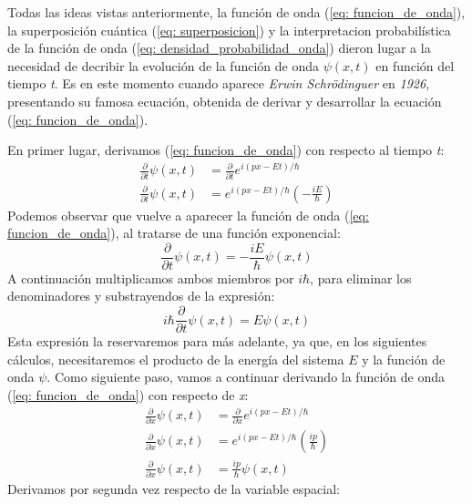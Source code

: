 \documentclass{article}
\numberwithin{equation}{section} %
\begin{document}
    Todas las ideas vistas anteriormente, la función de onda (\ref{eq: funcion_de_onda}), la superposición cuántica (\ref{eq: superposicion}) y la interpretacion probabilística de la función de onda (\ref{eq: densidad_probabilidad_onda}) dieron lugar a la necesidad de decribir la evolución de la función de onda \( \psi(x, t) \) en función del tiempo \textit{t}. Es en este momento cuando aparece \textit{Erwin Schrödinguer} en \textit{1926}, presentando su famosa ecuación, obtenida de derivar y desarrollar la ecuación  (\ref{eq: funcion_de_onda}). 
    
    En primer lugar, derivamos (\ref{eq: funcion_de_onda}) con respecto al tiempo \textit{t}:
    \begin{align*}
        \frac{\partial}{\partial t} \psi(x, t) &= \frac{\partial}{\partial t} e^{i(px - Et) / \hbar} \\[8pt]
        \frac{\partial}{\partial t} \psi(x, t) &= e^{i(px - Et) / \hbar} \left(- \frac{iE}{\hbar} \right)
    \end{align*}
    Podemos observar que vuelve a aparecer la función de onda (\ref{eq: funcion_de_onda}), al tratarse de una función exponencial:
    \begin{equation*}
        \frac{\partial}{\partial t} \psi(x, t) = - \frac{iE}{\hbar} \psi(x, t)
    \end{equation*}
    A continuación multiplicamos ambos miembros por \( i\hbar \), para eliminar los denominadores y substrayendos de la expresión:
    \begin{equation}
        i \hbar \frac{\partial}{\partial t} \psi(x, t) = E \psi(x, t)
        \label{eq: obtencion_schrodinguer}
    \end{equation}
    Esta expresión la reservaremos para más adelante, ya que, en los siguientes cálculos, necesitaremos el producto de la energía del sistema \( E \) y la función de onda \( \psi \). Como siguiente paso, vamos a continuar derivando la función de onda (\ref{eq: funcion_de_onda}) con respecto de \textit{x}:
    \begin{align*}
        \frac{\partial}{\partial x} \psi(x, t) &= \frac{\partial}{\partial x} e^{i(px - Et) / \hbar} \\[10pt]
        \frac{\partial}{\partial x} \psi(x, t) &= e^{i(px - Et) / \hbar} \left( \frac{ip}{\hbar} \right) \\[10pt]
        \frac{\partial}{\partial x} \psi(x, t) &= \frac{ip}{\hbar} \psi(x, t)
    \end{align*}
    Derivamos por segunda vez respecto de la variable espacial:
\end{document}
